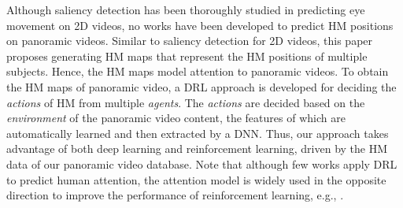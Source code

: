 \documentclass[10pt,journal,compsoc]{IEEEtran}
\begin{document}
Although saliency detection has been thoroughly studied in predicting eye movement on 2D videos, no works have been developed to predict HM positions on panoramic videos.
Similar to saliency detection for 2D videos, this paper proposes generating HM maps that represent the HM positions of multiple subjects. Hence, the HM maps model attention to panoramic videos. To obtain the HM maps of panoramic video, a DRL approach is developed for deciding the \textit{actions} of HM from multiple \textit{agents}. The \textit{actions} are decided based on the \textit{environment} of the panoramic video content, the features of which are automatically learned and then extracted by a DNN. Thus, our approach takes advantage of both deep learning and reinforcement learning, driven by the HM data of our panoramic video database.
Note that although few works apply DRL to predict human attention, the attention model is widely used in the opposite direction to improve the performance of reinforcement learning, e.g., \cite{minut2001reinforcement, mnih2014recurrent, jaderberg2016reinforcement, wang2016dueling}.
\end{document}
